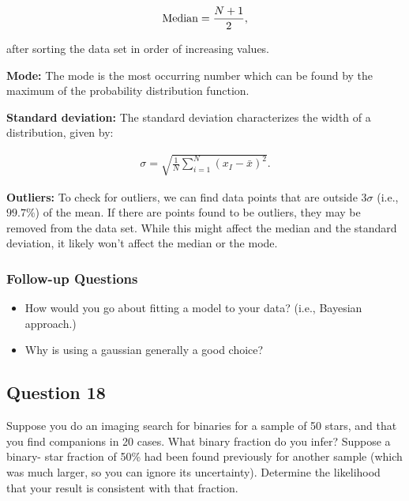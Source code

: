 \documentclass[a4paper,10pt]{article}
\begin{document}
\begin{align*}
{\rm Median} = \frac{N+1}{2},
\end{align*}

{\noindent}after sorting the data set in order of increasing values.

{\noindent}\textbf{Mode:} The mode is the most occurring number which can be found by the maximum of the probability distribution function.

{\noindent}\textbf{Standard deviation:} The standard deviation characterizes the width of a distribution, given by:

\begin{align*}
\sigma = \sqrt{\frac{1}{N}\sum_{i=1}^N(x_I-\bar{x})^2}.
\end{align*}

{\noindent}\textbf{Outliers:} To check for outliers, we can find data points that are outside $3\sigma$ (i.e., $99.7\%$) of the mean. If there are points found to be outliers, they may be removed from the data set. While this might affect the median and the standard deviation, it likely won't affect the median or the mode.

\subsubsection{Follow-up Questions}

\begin{itemize}
    \item How would you go about fitting a model to your data? (i.e., Bayesian approach.)
    \item Why is using a gaussian generally a good choice?
\end{itemize}


\newpage
\subsection{Question 18}

Suppose you do an imaging search for binaries for a sample of 50 stars, and that you find companions in 20 cases. What binary fraction do you infer? Suppose a binary- star fraction of 50\% had been found previously for another sample (which was much larger, so you can ignore its uncertainty). Determine the likelihood that your result is consistent with that fraction.
\end{document}
